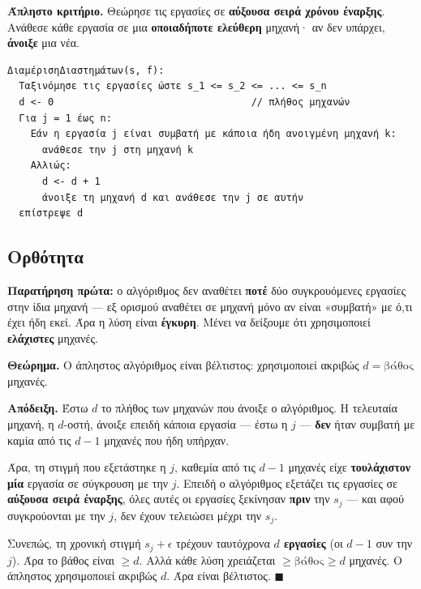 \documentclass[11pt,a4paper]{article}
\begin{document}
\begin{keypoint}
\textbf{Άπληστο κριτήριο.} Θεώρησε τις εργασίες σε \textbf{αύξουσα σειρά χρόνου
έναρξης}. Ανάθεσε κάθε εργασία σε μια \textbf{οποιαδήποτε ελεύθερη} μηχανή· αν
δεν υπάρχει, \textbf{άνοιξε} μια νέα.
\end{keypoint}

\begin{codebox}
\begin{verbatim}
ΔιαμέρισηΔιαστημάτων(s, f):
  Ταξινόμησε τις εργασίες ώστε s_1 <= s_2 <= ... <= s_n
  d <- 0                                  // πλήθος μηχανών
  Για j = 1 έως n:
    Εάν η εργασία j είναι συμβατή με κάποια ήδη ανοιγμένη μηχανή k:
      ανάθεσε την j στη μηχανή k
    Αλλιώς:
      d <- d + 1
      άνοιξε τη μηχανή d και ανάθεσε την j σε αυτήν
  επίστρεψε d
\end{verbatim}
\end{codebox}

\subsection{Ορθότητα}

\textbf{Παρατήρηση πρώτα:} ο αλγόριθμος δεν αναθέτει \textbf{ποτέ} δύο
συγκρουόμενες εργασίες στην ίδια μηχανή --- εξ ορισμού αναθέτει σε μηχανή μόνο αν
είναι «συμβατή» με ό,τι έχει ήδη εκεί. Άρα η λύση είναι \textbf{έγκυρη}. Μένει να
δείξουμε ότι χρησιμοποιεί \textbf{ελάχιστες} μηχανές.

\begin{keypoint}
\textbf{Θεώρημα.} Ο άπληστος αλγόριθμος είναι βέλτιστος: χρησιμοποιεί ακριβώς
$d = \text{βάθος}$ μηχανές.
\end{keypoint}

\textbf{Απόδειξη.} Έστω $d$ το πλήθος των μηχανών που άνοιξε ο αλγόριθμος. Η
τελευταία μηχανή, η $d$-οστή, άνοιξε επειδή κάποια εργασία --- έστω η $j$ ---
\textbf{δεν} ήταν συμβατή με καμία από τις $d-1$ μηχανές που ήδη υπήρχαν.

Άρα, τη στιγμή που εξετάστηκε η $j$, καθεμία από τις $d-1$ μηχανές είχε
\textbf{τουλάχιστον μία} εργασία σε σύγκρουση με την $j$. Επειδή ο αλγόριθμος
εξετάζει τις εργασίες σε \textbf{αύξουσα σειρά έναρξης}, όλες αυτές οι εργασίες
ξεκίνησαν \textbf{πριν} την $s_j$ --- και αφού συγκρούονται με την $j$, δεν έχουν
τελειώσει μέχρι την $s_j$.

Συνεπώς, τη χρονική στιγμή $s_j + \epsilon$ τρέχουν ταυτόχρονα \textbf{$d$
εργασίες} (οι $d-1$ συν την $j$). Άρα το βάθος είναι $\ge d$. Αλλά κάθε λύση
χρειάζεται $\ge \text{βάθος} \ge d$ μηχανές. Ο άπληστος χρησιμοποιεί ακριβώς $d$.
Άρα είναι βέλτιστος. $\blacksquare$
\end{document}
